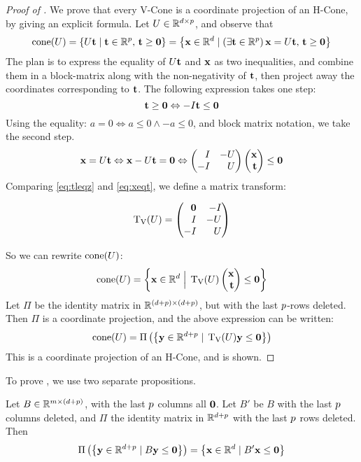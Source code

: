 \begin{proof}[Proof of ]
	We prove that every V-Cone is a coordinate projection of an H-Cone, by giving an explicit formula.  Let ${U \in \mathbb{R}^{d\times p}}$, and observe that
	\[ \operatorname{cone}(U) = \left\{U\mathbf{t} \;|\; \mathbf{t} \in \mathbb{R}^{p},\, \mathbf{t} \geq \mathbf{0}\right\} =
		\left\{\mathbf{x} \in \mathbb{R}^d \;|\; (\exists \mathbf{t} \in \mathbb{R}^{p})\,\mathbf{x} = U\mathbf{t},\, \mathbf{t} \geq \mathbf{0}\right\} \]
	The plan is to express the equality of $U\mathbf{t}$ and $\mathbf{x}$ as two inequalities, and combine them in a block-matrix along with the non-negativity of $\mathbf{t}$, then project away the coordinates corresponding to $\mathbf{t}$.  The following expression takes one step:
	\begin{equation}\label{eq:tleqz}
		\mathbf{t} \geq \mathbf{0} \Leftrightarrow -I\mathbf{t} \leq \mathbf{0}
	\end{equation}
	Using the equality: $a = 0 \Leftrightarrow a \leq 0 \land -a \leq 0$, and block matrix notation, we take the second step.
	\begin{equation}\label{eq:xeqt}
		\x = U\t \Leftrightarrow \x - U\t = \0 \Leftrightarrow
		\begin{pmatrix*}[r] I & -U \\ -I & U \end{pmatrix*} \xt \leq \0
	\end{equation}
	Comparing \eqref{eq:tleqz} and \eqref{eq:xeqt}, we define a matrix transform:
  \begin{Transform}\label{vconelift_transform}
  \[\VLift(U) = \pmb \0 & -I \\ I & -U \\ -I & U \pme \]
  \end{Transform}
  So we can rewrite $\operatorname{cone}(U)$:
	\begin{equation*}
		\cone(U) = \set{ \xv \St \VLift(U)\xt \leq \0}
	\end{equation*}
	Let $\Pi$ be the identity matrix in $\mathbb{R}^{(d+p)\times(d+p)}$, but with the last $p$-rows deleted.  Then $\Pi$ is a coordinate projection, and the above expression can be written:
	\begin{equation}\label{eq:vconelift}
		\operatorname{cone}(U) = \Pi\left(\left\{ \mathbf{y} \in \mathbb{R}^{d+p} \;|\; \operatorname{T_V}(U)\mathbf{y} \leq \mathbf{0}\right\}\right)
	\end{equation}
	This is a coordinate projection of an H-Cone, and  is shown.
\end{proof}

To prove , we use two separate propositions.
\begin{Prop}\label{proj_0_columns}
	Let $B\in\mathbb{R}^{m\times(d+p)}$, with the last $p$ columns all $\mathbf{0}$.  Let $B'$ be $B$ with the last $p$ columns deleted, and $\Pi$ the identity matrix in $\mathbb{R}^{d+p}$ with the last $p$ rows deleted.  Then
	\[ \Pi\left(\left\{\mathbf{y} \in \mathbb{R}^{d+p} \;|\; B\mathbf{y} \leq \mathbf{0}\right\}\right) =
		\left\{\mathbf{x}\in\mathbb{R}^d\;|\; B'\mathbf{x}\leq\mathbf{0}\right\} \]
\end{Prop}

